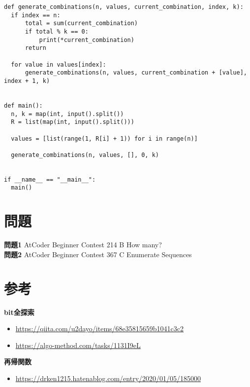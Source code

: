 \begin{lstlisting}[caption=再帰関数を使った解法, label=recursive_ans, frame=TRBL]
def generate_combinations(n, values, current_combination, index, k):
  if index == n:
      total = sum(current_combination)
      if total % k == 0:
          print(*current_combination)
      return

  for value in values[index]:
      generate_combinations(n, values, current_combination + [value], index + 1, k)


def main():
  n, k = map(int, input().split())
  R = list(map(int, input().split()))

  values = [list(range(1, R[i] + 1)) for i in range(n)]

  generate_combinations(n, values, [], 0, k)


if __name__ == "__main__":
  main()
\end{lstlisting}

\section{問題}

\textbf{問題1} AtCoder Beginner Contest 214 B How many?\\
\textbf{問題2}  AtCoder Beginner Contest 367 C Enumerate Sequences \\


\section{参考}
\textbf{bit全探索}
\begin{itemize}
	\item \url{https://qiita.com/u2dayo/items/68e35815659b1041c3c2}
	\item \url{https://algo-method.com/tasks/1131I9eL}
\end{itemize}

\noindent \textbf{再帰関数}
\begin{itemize}
  \item \url{https://drken1215.hatenablog.com/entry/2020/01/05/185000}
\end{itemize}

